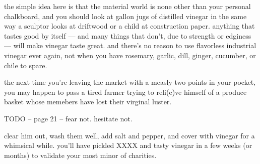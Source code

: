 the simple idea here is that the material world is none other than
your personal chalkboard, and you should look at gallon jugs of
distilled vinegar in the same way a sculptor looks at driftwood or a
child at construction paper. anything that tastes good by itself ---
and many things that don't, due to strength or edginess --- will make
vinegar taste great. and there's no reason to use flavorless
industrial vinegar ever again, not when you have rosemary, garlic,
dill, ginger, cucumber, or chile to spare.

the next time you're leaving the market with a measly two points in
your pocket, you may happen to pass a tired farmer trying to reli(e)ve
himself of a produce basket whose memebers have lost their virginal
luster.

TODO -- page 21 -- fear not. hesitate not.

clear him out, wash them well, add salt and pepper, and cover with
vinegar for a whimsical while. you'll have pickled XXXX and tasty
vinegar in a few weeks (or months) to validate your most minor of
charities.
